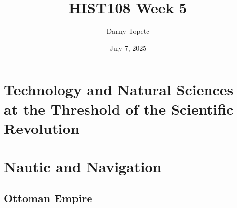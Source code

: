 \documentclass{article}
\title{HIST108 Week 5}
\author{Danny Topete}
\date{July 7, 2025}
\begin{document}
\maketitle

\section{Technology and Natural Sciences at the Threshold of the Scientific
Revolution}
\section*{Nautic and Navigation}

\subsection{Ottoman Empire}
\end{document}
